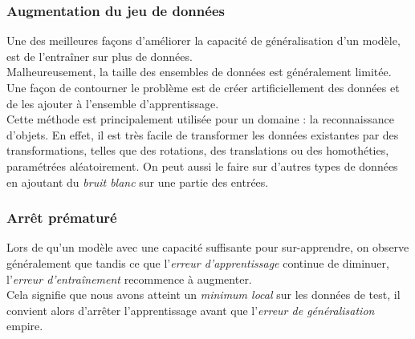 \documentclass[10pt,a4paper]{report}
\begin{document}
			\subsubsection{Augmentation du jeu de données}
			Une des meilleures façons d'améliorer la capacité de généralisation d'un modèle, est de l'entraîner sur plus de données.\\
			Malheureusement, la taille des ensembles de données est généralement limitée.\\
			Une façon de contourner le problème est de créer artificiellement des données et de les ajouter à l'ensemble d'apprentissage.\\
			Cette méthode est principalement utilisée pour un domaine : la reconnaissance d'objets.
			En effet, il est très facile de transformer les données existantes par des transformations, telles que des rotations, des translations ou des homothéties, paramétrées aléatoirement.
			On peut aussi le faire sur d'autres types de données en ajoutant du \emph{bruit blanc} sur une partie des entrées.
			\subsubsection{Arrêt prématuré}
			Lors de qu'un modèle avec une capacité suffisante pour sur-apprendre, on observe généralement que tandis ce que l'\emph{erreur d'apprentissage} continue de diminuer, l'\emph{erreur d'entraînement} recommence à augmenter.\\
			Cela signifie que nous avons atteint un \emph{minimum local} sur les données de test, il convient alors d'arrêter l'apprentissage avant que l'\emph{erreur de généralisation} empire.
\end{document}
